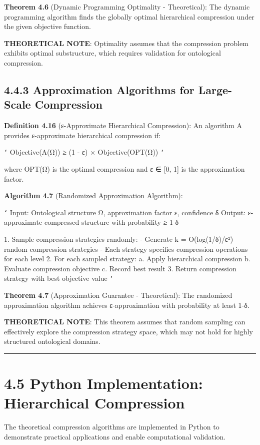 \textbf{Theorem 4.6} (Dynamic Programming Optimality - Theoretical): The dynamic programming algorithm finds the globally optimal hierarchical compression under the given objective function.

\textbf{THEORETICAL NOTE}: Optimality assumes that the compression problem exhibits optimal substructure, which requires validation for ontological compression.

\subsection{4.4.3 Approximation Algorithms for Large-Scale Compression}

\textbf{Definition 4.16} (ε-Approximate Hierarchical Compression): An algorithm A provides ε-approximate hierarchical compression if:

\texttt{`}
Objective(A(Ω)) ≥ (1 - ε) × Objective(OPT(Ω))
\texttt{`}

where OPT(Ω) is the optimal compression and ε ∈ [0, 1] is the approximation factor.

\textbf{Algorithm 4.7} (Randomized Approximation Algorithm):

\texttt{`}
Input: Ontological structure Ω, approximation factor ε, confidence δ
Output: ε-approximate compressed structure with probability ≥ 1-δ

1. Sample compression strategies randomly:
   - Generate k = O(log(1/δ)/ε²) random compression strategies
   - Each strategy specifies compression operations for each level
2. For each sampled strategy:
   a. Apply hierarchical compression
   b. Evaluate compression objective
   c. Record best result
3. Return compression strategy with best objective value
\texttt{`}

\textbf{Theorem 4.7} (Approximation Guarantee - Theoretical): The randomized approximation algorithm achieves ε-approximation with probability at least 1-δ.

\textbf{THEORETICAL NOTE}: This theorem assumes that random sampling can effectively explore the compression strategy space, which may not hold for highly structured ontological domains.

\hrule

\section{4.5 Python Implementation: Hierarchical Compression}

The theoretical compression algorithms are implemented in Python to demonstrate practical applications and enable computational validation.

